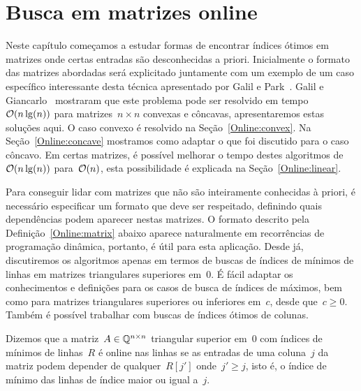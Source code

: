\chapter{Busca em matrizes online}
\label{Online}

Neste capítulo começamos a estudar formas de encontrar índices ótimos em matrizes onde certas entradas são desconhecidas a priori. Inicialmente o formato das matrizes abordadas será explicitado juntamente com um exemplo de um caso específico interessante desta técnica apresentado por Galil e Park~\cite{Galil:1992}. Galil e Giancarlo~\cite{Galil:1989} mostraram que este problema pode ser resolvido em tempo~$\mathcal{O}(n\lg(n))$ para matrizes~$n \times n$ convexas e côncavas, apresentaremos estas soluções aqui. O caso convexo é resolvido na Seção~\ref{Online:convex}. Na Seção~\ref{Online:concave} mostramos como adaptar o que foi discutido para o caso côncavo. Em certas matrizes, é possível melhorar o tempo destes algoritmos de~$\mathcal{O}(n\lg(n))$ para~$\mathcal{O}(n)$, esta possibilidade é explicada na Seção~\ref{Online:linear}.

Para conseguir lidar com matrizes que não são inteiramente conhecidas à priori, é necessário especificar um formato que deve ser respeitado, definindo quais dependências podem aparecer nestas matrizes. O formato descrito pela Definição~\ref{Online:matrix} abaixo aparece naturalmente em recorrências de programação dinâmica, portanto, é útil para esta aplicação. Desde já, discutiremos os algoritmos apenas em termos de buscas de índices de mínimos de linhas em matrizes triangulares superiores em~0. É fácil adaptar os conhecimentos e definições para os casos de busca de índices de máximos, bem como para matrizes triangulares superiores ou inferiores em~$c$, desde que~$c \geq 0$. Também é possível trabalhar com buscas de índices ótimos de colunas.

\begin{defi} \label{Online:matrix}
Dizemos que a matriz~$A \in \mathbb{Q}^{n \times n}$ triangular superior em~0 com índices de mínimos de linhas~$R$ é online nas linhas se as entradas de uma coluna~$j$ da matriz podem depender de qualquer~$R[j']$ onde~$j' \geq j$, isto é, o índice de mínimo das linhas de índice maior ou igual a~$j$.
\end{defi}


